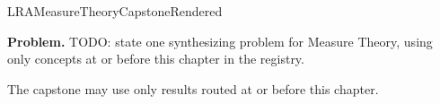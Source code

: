 \ifcsname LRAMeasureTheoryCapstoneRendered\endcsname
\else
\expandafter\gdef\csname LRAMeasureTheoryCapstoneRendered\endcsname{}

\newpage
{}
\label{cap:measure-theory}

\begin{tcolorbox}[
  colback=gray!6,
  colframe=gray!40,
  arc=2pt,
  left=8pt, right=8pt, top=6pt, bottom=6pt,
  title={\small\textbf{Capstone Problem}},
  fonttitle=\small\bfseries
]
\textbf{Problem.}
TODO: state one synthesizing problem for Measure Theory, using only concepts at or
before this chapter in the registry.
\end{tcolorbox}

\begin{remark*}
The capstone may use only results routed at or before this chapter.
\end{remark*}

\clearpage
\fi
